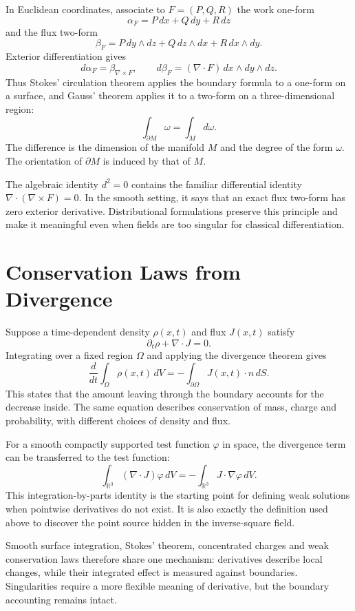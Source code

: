 In Euclidean coordinates, associate to \(F=(P,Q,R)\) the work one-form
\[
 \alpha_F=P\,dx+Q\,dy+R\,dz
\]
and the flux two-form
\[
 \beta_F=P\,dy\wedge dz+Q\,dz\wedge dx+R\,dx\wedge dy.
\]
Exterior differentiation gives
\[
 d\alpha_F=\beta_{\nabla\times F},\qquad
 d\beta_F=(\nabla\cdot F)\,dx\wedge dy\wedge dz.
\]
Thus Stokes' circulation theorem applies the boundary formula to a one-form on a surface, and Gauss' theorem applies it to a two-form on a three-dimensional region:
\[
 \boxed{\int_{\partial M}\omega=\int_Md\omega.}
\]
The difference is the dimension of the manifold \(M\) and the degree of the form \(\omega\). The orientation of \(\partial M\) is induced by that of \(M\).

The algebraic identity \(d^2=0\) contains the familiar differential identity \(\nabla\cdot(\nabla\times F)=0\). In the smooth setting, it says that an exact flux two-form has zero exterior derivative. Distributional formulations preserve this principle and make it meaningful even when fields are too singular for classical differentiation.

\section{Conservation Laws from Divergence}

Suppose a time-dependent density \(\rho(x,t)\) and flux \(J(x,t)\) satisfy
\[
 \partial_t\rho+\nabla\cdot J=0.
\]
Integrating over a fixed region \(\Omega\) and applying the divergence theorem gives
\[
 \boxed{\frac d{dt}\int_\Omega\rho(x,t)\,dV
 =-\int_{\partial\Omega}J(x,t)\cdot n\,dS.}
\]
This states that the amount leaving through the boundary accounts for the decrease inside. The same equation describes conservation of mass, charge and probability, with different choices of density and flux.

For a smooth compactly supported test function \(\varphi\) in space, the divergence term can be transferred to the test function:
\[
 \int_{\mathbb R^3}(\nabla\cdot J)\varphi\,dV
 =-\int_{\mathbb R^3}J\cdot\nabla\varphi\,dV.
\]
This integration-by-parts identity is the starting point for defining weak solutions when pointwise derivatives do not exist. It is also exactly the definition used above to discover the point source hidden in the inverse-square field.

Smooth surface integration, Stokes' theorem, concentrated charges and weak conservation laws therefore share one mechanism: derivatives describe local changes, while their integrated effect is measured against boundaries. Singularities require a more flexible meaning of derivative, but the boundary accounting remains intact.

